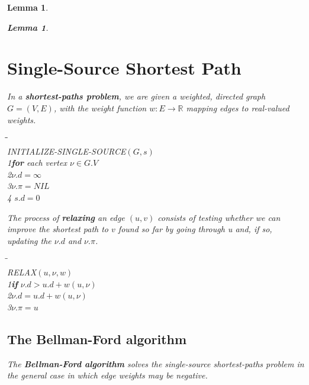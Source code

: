 \documentclass[a4paper,11pt]{book}
\newtheorem{lemma}[theorem]{Lemma}
\begin{document}
{\begin{lemma}
\begin{lemma}
\section{Single-Source Shortest Path}
In a \textbf{shortest-paths problem}, we are given a weighted, directed graph $G = (V, E)$, with the weight function $w : E\rightarrow\mathbb{R}$ mapping edges to real-valued weights. 
\begin{tabbing}
\hspace{.8cm}\=\hspace{.8cm}\=\hspace{.8cm}\=\hspace{.8cm}\=\\
INITIALIZE-SINGLE-SOURCE$(G,s)$\\
1\>\textbf{for} each vertex $\nu\in G.V$\\
2\>\>$\nu.d=\infty$\\
3\>\>$\nu.\pi = NIL$\\
4\> $s.d = 0$
\end{tabbing}
The process of \textbf{relaxing} an edge $(u,v)$ consists of testing whether we can improve the shortest path to $v$ found so far by going through u and, if so, updating the $\nu.d$ and $\nu.\pi$.
\begin{tabbing}
\hspace{.8cm}\=\hspace{.8cm}\=\hspace{.8cm}\=\\
RELAX$(u,\nu,w)$\\
1\>\textbf{if} $\nu.d>u.d +w(u,\nu)$\\
2\>\>$\nu.d = u.d + w(u,\nu)$\\
3\>\>$\nu.\pi = u$
\end{tabbing}

\subsection{The Bellman-Ford algorithm}
The \textbf{Bellman-Ford algorithm} solves the single-source shortest-paths problem in the general case in which edge \emph{weights may be negative}.


\end{lemma}
\end{lemma}}
\end{document}
